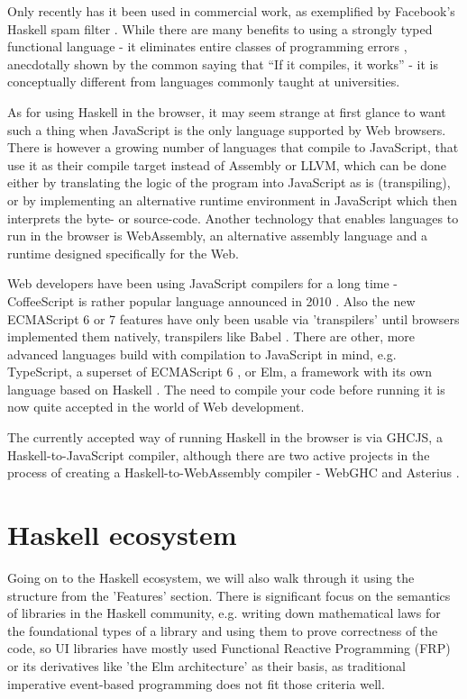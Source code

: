 \documentclass[english,odsaz]{fitthesis}
\begin{document}
Only recently has it been used in commercial work, as exemplified by Facebook's
Haskell spam filter \cite{marlow2015fighting}. While there are many benefits to
using a strongly typed functional language - it eliminates entire classes of
programming errors \cite{Nanz_2015}, anecdotally shown by the common saying that
``If it compiles, it works'' - it is conceptually different from languages
commonly taught at universities.

As for using Haskell in the browser, it may seem strange at first glance to want
such a thing when JavaScript is the only language supported by Web
browsers. There is however a growing number of languages that compile to
JavaScript, that use it as their compile target instead of Assembly or LLVM,
which can be done either by translating the logic of the program into JavaScript
as is (transpiling), or by implementing an alternative runtime environment in
JavaScript which then interprets the byte- or source-code. Another technology
that enables languages to run in the browser is WebAssembly, an alternative
assembly language and a runtime designed specifically for the Web.

Web developers have been using JavaScript compilers for a long time -
CoffeeScript is rather popular language announced in 2010
\cite{coffeescript}. Also the new ECMAScript 6 or 7 features have only been usable
via 'transpilers' until browsers implemented them natively, transpilers like
Babel \cite{babel}. There are other, more advanced languages build with
compilation to JavaScript in mind, e.g. TypeScript, a superset of ECMAScript 6
\cite{typescript}, or Elm, a framework with its own language based on Haskell
\cite{czaplicki2012elm}. The need to compile your code before running it is now
quite accepted in the world of Web development.

The currently accepted way of running Haskell in the browser is via GHCJS, a
Haskell-to-JavaScript compiler, although there are two active projects in the
process of creating a Haskell-to-WebAssembly compiler - WebGHC \cite{webghc} and
Asterius \cite{asterius}.

\section{Haskell ecosystem}
\label{sec:org521cfc1}
Going on to the Haskell ecosystem, we will also walk through it using the
structure from the 'Features' section. There is significant focus on the
semantics of libraries in the Haskell community, e.g. writing down mathematical
laws for the foundational types of a library and using them to prove correctness
of the code, so UI libraries have mostly used Functional Reactive Programming
(FRP) or its derivatives like 'the Elm architecture' \cite{loder2018web} as their
basis, as traditional imperative event-based programming does not fit those
criteria well.
\end{document}

